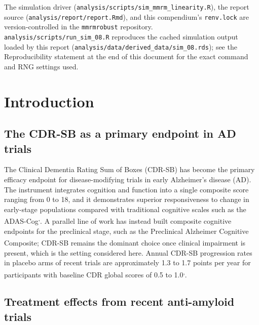 \documentclass[
  11pt,
]{article}
\begin{document}
The simulation driver (\texttt{analysis/scripts/sim\_mmrm\_linearity.R}),
the report source (\texttt{analysis/report/report.Rmd}), and this
compendium's \texttt{renv.lock} are version-controlled in the
\texttt{mmrmrobust} repository. \texttt{analysis/scripts/run\_sim\_08.R}
reproduces the cached simulation output loaded by this report
(\texttt{analysis/data/derived\_data/sim\_08.rds}); see the
Reproducibility statement at the end of this document for the
exact command and RNG settings used.

\section{Introduction}\label{introduction}

\subsection{The CDR-SB as a primary endpoint in AD trials}\label{the-cdr-sb-as-a-primary-endpoint-in-ad-trials}

The Clinical Dementia Rating Sum of Boxes (CDR-SB) has
become the primary efficacy endpoint for disease-modifying
trials in early Alzheimer's disease (AD). The instrument
integrates cognition and function into a single composite
score ranging from 0 to 18, and it demonstrates superior
responsiveness to change in early-stage populations compared
with traditional cognitive scales such as the ADAS-Cog\textsuperscript{,}. A parallel
line of work has instead built composite cognitive endpoints
for the preclinical stage, such as the Preclinical Alzheimer
Cognitive Composite\textsuperscript{}; CDR-SB remains the
dominant choice once clinical impairment is present, which
is the setting considered here. Annual
CDR-SB progression rates in placebo arms of recent trials
are approximately 1.3 to 1.7 points per year for
participants with baseline CDR global scores of 0.5 to 1.0\textsuperscript{,}.

\subsection{Treatment effects from recent anti-amyloid trials}\label{treatment-effects-from-recent-anti-amyloid-trials}
\end{document}
